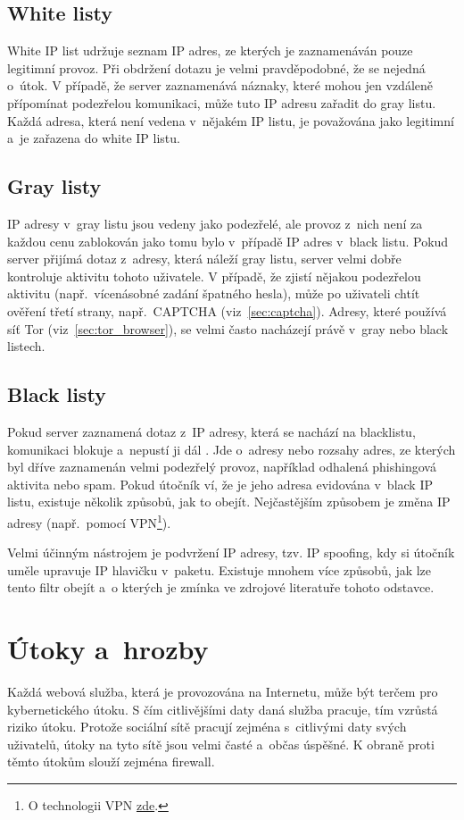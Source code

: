 \subsection*{White listy}
White IP list udržuje seznam IP adres, ze kterých je zaznamenáván pouze legitimní provoz. Při obdržení dotazu je velmi pravděpodobné, že se nejedná o~útok. V případě, že server zaznamenává náznaky, které mohou jen vzdáleně přípomínat podezřelou komunikaci, může tuto IP adresu zařadit do gray listu. Každá adresa, která není vedena v~nějakém IP listu, je považována jako legitimní a~je zařazena do white IP listu.

\subsection*{Gray listy}
\label{sec:gray_list}
IP adresy v~gray listu jsou vedeny jako podezřelé, ale provoz z~nich není za každou cenu zablokován jako tomu bylo v~případě IP adres v~black listu. Pokud server přijímá dotaz z~adresy, která náleží gray listu, server velmi dobře kontroluje aktivitu tohoto uživatele. V případě, že zjistí nějakou podezřelou aktivitu (např.~vícenásobné zadání špatného hesla), může po uživateli chtít ověření třetí strany, např.~CAPTCHA (viz~\ref{sec:captcha}). Adresy, které používá síť Tor (viz~\ref{sec:tor_browser}), se velmi často nacházejí právě v~gray nebo black listech.

\subsection*{Black listy}
Pokud server zaznamená dotaz z~IP adresy, která se nachází na blacklistu, komunikaci blokuje a~nepustí ji dál \cite{bib:black_list}. Jde o~adresy nebo rozsahy adres, ze kterých byl dříve zaznamenán velmi podezřelý provoz, například odhalená phishingová aktivita nebo spam. Pokud útočník ví, že je jeho adresa evidována v~black IP listu, existuje několik způsobů, jak to obejít. Nejčastějším způsobem je změna IP adresy (např.~pomocí VPN\footnote{O technologii VPN \href{https://blog.avast.com/cs/co-je-vpn-a-jak-funguje}{zde}.}).

Velmi účinným nástrojem je podvržení IP adresy, tzv. IP spoofing, kdy si útočník uměle upravuje IP hlavičku v~paketu. Existuje mnohem více způsobů, jak lze tento filtr obejít a~o kterých je zmínka ve zdrojové literatuře tohoto odstavce.

\section{Útoky a~hrozby}
Každá webová služba, která je provozována na Internetu, může být terčem pro kybernetického útoku. S čím citlivějšími daty daná služba pracuje, tím vzrůstá riziko útoku. Protože sociální sítě pracují zejména s~citlivými daty svých uživatelů, útoky na tyto sítě jsou velmi časté a~občas úspěšné. K obraně proti těmto útokům slouží zejména firewall.

